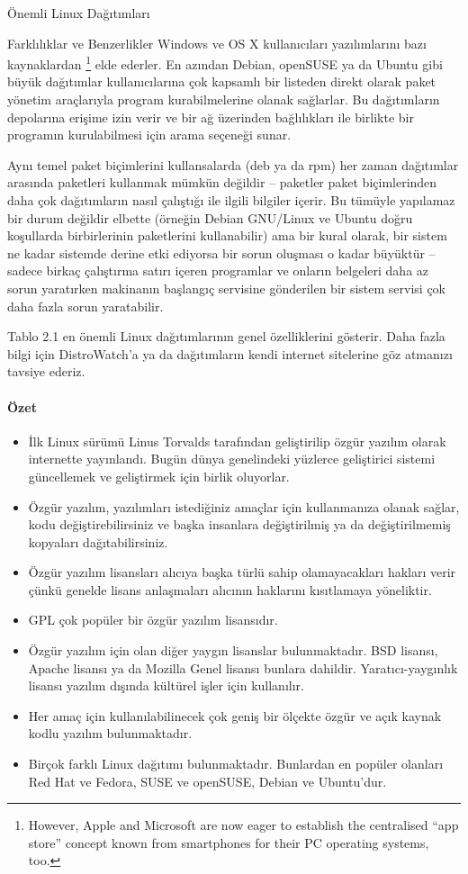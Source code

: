 \begin{section}{Önemli Linux Dağıtımları}
\begin{subsection}{Farklılıklar ve Benzerlikler}
Windows ve OS X kullanıcıları yazılımlarını bazı kaynaklardan
\footnote{However, Apple and Microsoft are now eager to establish the centralised “app store” concept known from smartphones for their PC operating systems, too.} elde ederler. En azından Debian, openSUSE ya da Ubuntu gibi büyük dağıtımlar kullanıcılarına çok kapsamlı bir listeden direkt olarak paket yönetim araçlarıyla program kurabilmelerine olanak sağlarlar. Bu dağıtımların depolarına erişime izin verir ve bir ağ üzerinden bağlılıkları ile birlikte bir programın kurulabilmesi için arama seçeneği sunar.

Aynı temel paket biçimlerini kullansalarda (deb ya da rpm) her zaman dağıtımlar arasında paketleri kullanmak mümkün değildir – paketler paket biçimlerinden daha çok dağıtımların nasıl çalıştığı ile ilgili bilgiler içerir. Bu tümüyle yapılamaz bir durum değildir elbette (örneğin Debian GNU/Linux ve Ubuntu doğru koşullarda birbirlerinin paketlerini kullanabilir) ama bir kural olarak, bir sistem ne kadar sistemde derine etki ediyorsa bir sorun oluşması o kadar büyüktür – sadece birkaç çalıştırma satırı içeren programlar ve onların belgeleri daha az sorun yaratırken makinanın başlangıç servisine gönderilen bir sistem servisi çok daha fazla sorun yaratabilir.

Tablo 2.1 en önemli Linux dağıtımlarının genel özelliklerini gösterir. Daha fazla bilgi için DistroWatch'a ya da dağıtımların kendi internet sitelerine göz atmanızı tavsiye ederiz.
\paragraph{Özet}{
\begin{itemize}
 \item İlk Linux sürümü Linus Torvalds tarafından geliştirilip özgür yazılım olarak internette yayınlandı. Bugün dünya genelindeki yüzlerce geliştirici sistemi güncellemek ve geliştirmek için birlik oluyorlar.
 \item Özgür yazılım, yazılımları istediğiniz amaçlar için kullanmanıza olanak sağlar, kodu değiştirebilirsiniz ve başka insanlara değiştirilmiş ya da değiştirilmemiş kopyaları dağıtabilirsiniz.
 \item Özgür yazılım lisansları alıcıya başka türlü sahip olamayacakları hakları verir çünkü genelde lisans anlaşmaları alıcının haklarını kısıtlamaya yöneliktir.
 \item GPL çok popüler bir özgür yazılım lisansıdır.
 \item Özgür yazılım için olan diğer yaygın lisanslar bulunmaktadır. BSD lisansı, Apache lisansı ya da Mozilla Genel lisansı bunlara dahildir. Yaratıcı-yaygınlık lisansı yazılım dışında kültürel işler için kullanılır.
 \item Her amaç için kullanılabilinecek çok geniş bir ölçekte özgür ve açık kaynak kodlu yazılım bulunmaktadır.
 \item Birçok farklı Linux dağıtımı bulunmaktadır. Bunlardan en popüler olanları Red Hat ve Fedora, SUSE ve openSUSE, Debian ve Ubuntu'dur.
\end{itemize}}
\end{subsection}
\end{section}
